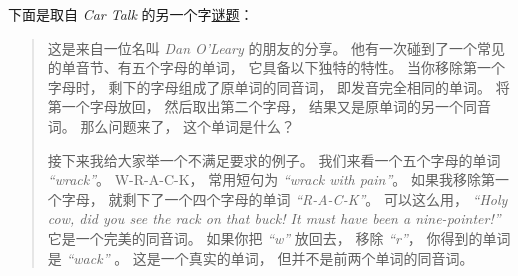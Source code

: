 \begin{exercise}

  


下面是取自 {\em Car Talk} 的另一个字\href{http://www.cartalk.com/content/puzzlers}{谜题}：


\begin{quote}

这是来自一位名叫 {\em Dan O'Leary} 的朋友的分享。  他有一次碰到了一个常见的单音节、有五个字母的单词， 它具备以下独特的特性。  当你移除第一个字母时， 剩下的字母组成了原单词的同音词， 即发音完全相同的单词。  将第一个字母放回， 然后取出第二个字母， 结果又是原单词的另一个同音词。  那么问题来了， 这个单词是什么？

接下来我给大家举一个不满足要求的例子。  我们来看一个五个字母的单词 {\em ``wrack''}。  W-R-A-C-K， 常用短句为  {\em ``wrack with pain''}。   如果我移除第一个字母， 就剩下了一个四个字母的单词  {\em ``R-A-C-K''}。  可以这么用，  {\em ``Holy cow, did you see the rack on that buck! It must have been a nine-pointer!''} 它是一个完美的同音词。  如果你把  {\em ``w''} 放回去， 移除  {\em ``r''}，  你得到的单词是  {\em ``wack''} 。   这是一个真实的单词， 但并不是前两个单词的同音词。


\end{quote}
\end{exercise}

